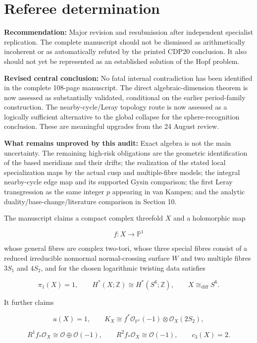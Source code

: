 \documentclass[
  10pt,
  letterpaper,
]{article}
\newcommand{\Z}{\mathbb Z}
\newcommand{\Pone}{\mathbb P^1}
\newcommand{\cO}{\mathcal O}
\begin{document}
\section{Referee determination}\label{referee-determination}

\textbf{Recommendation:} Major revision and resubmission after
independent specialist replication. The complete manuscript should not
be dismissed as arithmetically incoherent or as automatically refuted by
the printed CDP20 conclusion. It also should not yet be represented as
an established solution of the Hopf problem.

\textbf{Revised central conclusion:} No fatal internal contradiction has
been identified in the complete 108-page manuscript. The direct
algebraic-dimension theorem is now assessed as substantially validated,
conditional on the earlier period-family construction. The
nearby-cycle/Leray topology route is now assessed as a logically
sufficient alternative to the global collapse for the sphere-recognition
conclusion. These are meaningful upgrades from the 24 August review.

\textbf{What remains unproved by this audit:} Exact algebra is not the
main uncertainty. The remaining high-risk obligations are the geometric
identification of the based meridians and their drifts; the realization
of the stated local specialization maps by the actual cusp and
multiple-fibre models; the integral nearby-cycle edge map and its
supported Gysin comparison; the first Leray transgression as the same
integer \(p\) appearing in van Kampen; and the analytic
duality/base-change/literature comparison in Section 10.

The manuscript claims a compact complex threefold \(X\) and a
holomorphic map

\[
f:X\longrightarrow \Pone
\]

whose general fibres are complex two-tori, whose three special fibres
consist of a reduced irreducible nonnormal normal-crossing surface \(W\)
and two multiple fibres \(3S_1\) and \(4S_2\), and for the chosen
logarithmic twisting data satisfies

\[
\pi_1(X)=1,
\qquad H^*(X;\Z)\cong H^*(S^6;\Z),
\qquad X\cong_{\mathrm{diff}}S^6.
\]

It further claims

\[
a(X)=1,
\qquad K_X\cong f^*\cO_{\Pone}(-1)\otimes\cO_X(2S_2),
\]

\[
R^1f_*\cO_X\cong\cO\oplus\cO(-1),
\qquad R^2f_*\cO_X\cong\cO(-1),
\qquad c_3(X)=2.
\]
\end{document}
